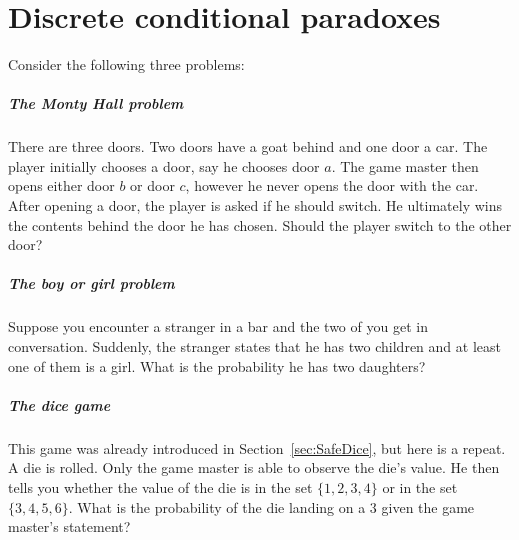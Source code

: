\documentclass[a4paper]{report}
\theoremstyle{plain}
\theoremstyle{definition}
\theoremstyle{remark}
\numberwithin{equation}{chapter}
\DeclareMathOperator{\1}{\mathbbm{1}}
\begin{document}
\chapter{Discrete conditional paradoxes}\label{chap:DiscPara}
Consider the following three problems:

\paragraph{The Monty Hall problem}
There are three doors. Two doors have a goat behind and one door a car. The player initially chooses a door, say he chooses door $a$. The game master then opens either door $b$ or door $c$, however he never opens the door with the car. After opening a door, the player is asked if he should switch. He ultimately wins the contents behind the door he has chosen. Should the player switch to the other door?


\paragraph{The boy or girl problem}
Suppose you encounter a stranger in a bar and the two of you get in conversation. Suddenly, the stranger states that he has two children and at least one of them is a girl. What is the probability he has two daughters?

\paragraph{The dice game}
This game was already introduced in Section~\ref{sec:SafeDice}, but here is a repeat. A die is rolled. Only the game master is able to observe the die's value. He then tells you whether the value of the die is in the set $\{1,2,3,4\}$ or in the set $\{3,4,5,6\}$. What is the probability of the die landing on a $3$ given the game master's statement?
\end{document}
